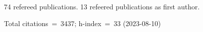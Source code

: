 74 refereed publications. 13 refeered publications as first author.

Total citations~=~3437; h-index~=~33 (2023-08-10)